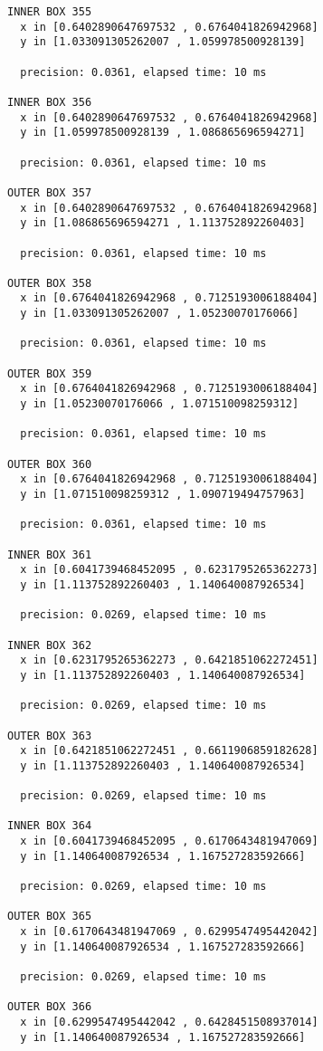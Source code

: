 \begin{verbatim}
INNER BOX 355
  x in [0.6402890647697532 , 0.6764041826942968]
  y in [1.033091305262007 , 1.059978500928139]

  precision: 0.0361, elapsed time: 10 ms

INNER BOX 356
  x in [0.6402890647697532 , 0.6764041826942968]
  y in [1.059978500928139 , 1.086865696594271]

  precision: 0.0361, elapsed time: 10 ms

OUTER BOX 357
  x in [0.6402890647697532 , 0.6764041826942968]
  y in [1.086865696594271 , 1.113752892260403]

  precision: 0.0361, elapsed time: 10 ms

OUTER BOX 358
  x in [0.6764041826942968 , 0.7125193006188404]
  y in [1.033091305262007 , 1.05230070176066]

  precision: 0.0361, elapsed time: 10 ms

OUTER BOX 359
  x in [0.6764041826942968 , 0.7125193006188404]
  y in [1.05230070176066 , 1.071510098259312]

  precision: 0.0361, elapsed time: 10 ms

OUTER BOX 360
  x in [0.6764041826942968 , 0.7125193006188404]
  y in [1.071510098259312 , 1.090719494757963]

  precision: 0.0361, elapsed time: 10 ms

INNER BOX 361
  x in [0.6041739468452095 , 0.6231795265362273]
  y in [1.113752892260403 , 1.140640087926534]

  precision: 0.0269, elapsed time: 10 ms

INNER BOX 362
  x in [0.6231795265362273 , 0.6421851062272451]
  y in [1.113752892260403 , 1.140640087926534]

  precision: 0.0269, elapsed time: 10 ms

OUTER BOX 363
  x in [0.6421851062272451 , 0.6611906859182628]
  y in [1.113752892260403 , 1.140640087926534]

  precision: 0.0269, elapsed time: 10 ms

INNER BOX 364
  x in [0.6041739468452095 , 0.6170643481947069]
  y in [1.140640087926534 , 1.167527283592666]

  precision: 0.0269, elapsed time: 10 ms

OUTER BOX 365
  x in [0.6170643481947069 , 0.6299547495442042]
  y in [1.140640087926534 , 1.167527283592666]

  precision: 0.0269, elapsed time: 10 ms

OUTER BOX 366
  x in [0.6299547495442042 , 0.6428451508937014]
  y in [1.140640087926534 , 1.167527283592666]


\end{verbatim}
